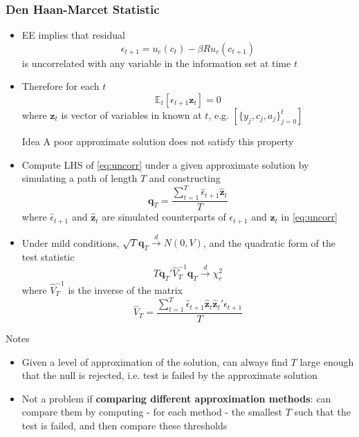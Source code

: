 \documentclass{beamer}
\begin{document}
\begin{frame}
  \frametitle{Den Haan-Marcet Statistic}
  \begin{itemize}
    \item EE implies that residual
    \begin{equation*}
      \epsilon_{t+1} = u_c(c_t) - \beta R u_c(c_{t+1})
    \end{equation*}
    is uncorrelated with any variable in the information set at time $t$
    \item Therefore for each $t$
    \begin{equation}\label{eq:uncorr}
      \mathbb{E}_t[\epsilon_{t+1} \mathbf{z}_t]=0
    \end{equation}
    where $\mathbf{z}_t$ is vector of variables in known at $t$, e.g. $[\{y_j, c_j, a_j\}_{j=0}^{t}]$
    \begin{block}{Idea}
      A poor approximate solution does not satisfy this property
    \end{block}
    \item Compute LHS of \ref{eq:uncorr} under a given approximate solution by simulating a path of length $T$ and constructing
    \begin{equation*}
      \mathbf{q}_T = \frac{\sum_{t=1}^T \hat{\epsilon}_{t+1}\hat{\mathbf{z}}_t}{T}
    \end{equation*}
    where $\hat{\epsilon}_{t+1}$ and $\hat{\mathbf{z}}_t$ are simulated counterparts of $\epsilon_{t+1}$ and $\mathbf{z}_t$ in \ref{eq:uncorr}
    \end{itemize}
\end{frame}

\begin{frame}
  \begin{itemize}
    \item Under mild conditions, $\sqrt{T}\mathbf{q}_T\xrightarrow{d}N(0,V)$, and the quadratic form of the test statistic
    \begin{equation*}
      T\mathbf{q}_T'\hat{V}_T^{-1}\mathbf{q}_T\xrightarrow{d}\chi^2_r
    \end{equation*}
    where $\hat{V}_T^{-1}$ is the inverse of the matrix
    \begin{equation*}
      \hat{V}_T = \frac{\sum_{t=1}^T \hat{\epsilon}_{t+1}\hat{\mathbf{z}}_t\hat{\mathbf{z}}_t'\hat{\epsilon}_{t+1}}{T}
    \end{equation*}
  \end{itemize}
  \begin{block}{Notes}
    \begin{itemize}
      \item Given a level of approximation of the solution, can always find $T$ large enough that the null is rejected, i.e. test is failed by the approximate solution
      \item Not a problem if \textbf{comparing different approximation methods}: can compare them by computing - for each method - the smallest $T$ such that the test is failed, and then compare these thresholds
  \end{itemize}
  \end{block}
\end{frame}
\end{document}
